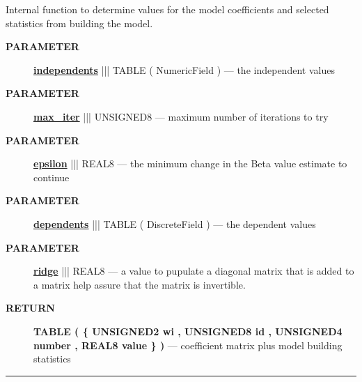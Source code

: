 Internal function to determine values for the model coefficients and selected statistics from building the model.






\par
\begin{description}
\item [\colorbox{tagtype}{\color{white} \textbf{\textsf{PARAMETER}}}] \textbf{\underline{independents}} ||| TABLE ( NumericField ) --- the independent values
\item [\colorbox{tagtype}{\color{white} \textbf{\textsf{PARAMETER}}}] \textbf{\underline{max\_iter}} ||| UNSIGNED8 --- maximum number of iterations to try
\item [\colorbox{tagtype}{\color{white} \textbf{\textsf{PARAMETER}}}] \textbf{\underline{epsilon}} ||| REAL8 --- the minimum change in the Beta value estimate to continue
\item [\colorbox{tagtype}{\color{white} \textbf{\textsf{PARAMETER}}}] \textbf{\underline{dependents}} ||| TABLE ( DiscreteField ) --- the dependent values
\item [\colorbox{tagtype}{\color{white} \textbf{\textsf{PARAMETER}}}] \textbf{\underline{ridge}} ||| REAL8 --- a value to pupulate a diagonal matrix that is added to a matrix help assure that the matrix is invertible.
\end{description}







\par
\begin{description}
\item [\colorbox{tagtype}{\color{white} \textbf{\textsf{RETURN}}}] \textbf{TABLE ( \{ UNSIGNED2 wi , UNSIGNED8 id , UNSIGNED4 number , REAL8 value \} )} --- coefficient matrix plus model building statistics
\end{description}




\rule{\linewidth}{0.5pt}
